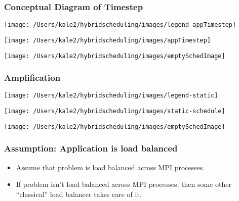 \begin{frame}
\frametitle{Conceptual Diagram of Timestep }
%
\texttt{[image: /Users/kale2/hybridscheduling/images/legend-appTimestep]}
\begin{center}
\texttt{[image: /Users/kale2/hybridscheduling/images/appTimestep]}
\end{center}
\begin{center}
\texttt{[image: /Users/kale2/hybridscheduling/images/emptySchedImage]}
\end{center}
\end{frame}

\begin{frame}
\frametitle{Amplification}
\texttt{[image: /Users/kale2/hybridscheduling/images/legend-static]}
\begin{center}
\texttt{[image: /Users/kale2/hybridscheduling/images/static-schedule]}
\end{center}
\begin{center}
\texttt{[image: /Users/kale2/hybridscheduling/images/emptySchedImage]}
\end{center}
\end{frame}


\begin{frame}
\frametitle{Assumption: Application is load balanced }
\begin{itemize}
\item \small Assume that problem is load balanced across MPI processes.
\item \small If problem isn't load balanced across MPI processes, then some other ``classical'' load balancer takes care of it.
\end{itemize}
\end{frame}



